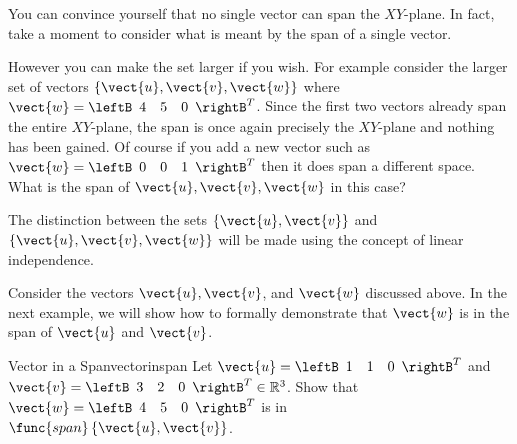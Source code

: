 You can convince yourself that no single vector can span the
$XY$-plane. In fact, take a moment to consider what is meant by the span of a single vector.

However you can make the set larger if you wish. For example consider
the larger set of vectors $\{ \vect{u}, \vect{v},
\vect{w}\}$ where $ \vect{w}=\leftB 
\begin{array}{rrr}
4 & 5 & 0
\end{array}
\rightB^T$. 
Since
the first two vectors already span the entire $XY$-plane, the span is
once again precisely the $XY$-plane and nothing has been gained. Of
course if you add a new vector such as
$ \vect{w}=\leftB 
\begin{array}{rrr}
0 & 0 & 1
\end{array}
\rightB^T$ then it does span a different space. What is the span of $\vect{u}, \vect{v}, \vect{w}$ in this case?   

The distinction between the sets $\{ \vect{u}, \vect{v}\}$ and $\{
\vect{u}, \vect{v}, \vect{w}\}$ will be made using the concept of linear independence. 

Consider the vectors $\vect{u}, \vect{v}$, and $\vect{w}$ discussed above. In the next example, we will show how to formally demonstrate that $\vect{w}$ is in the span of $\vect{u}$ and $\vect{v}$. 

\begin{example}{Vector in a Span}{vectorinspan}
Let $\vect{u}=\leftB 
\begin{array}{rrr}
1  & 1 & 0
\end{array}
\rightB^T$ and
$\vect{v}=\leftB 
\begin{array}{rrr}
3  & 2 & 0
\end{array}
\rightB^T \in \mathbb{R}^{3}$. Show that $\vect{w} = \leftB 
\begin{array}{rrr}
4 & 5 & 0 
\end{array}
\rightB^{T}$ is in $\func{span} \left\{ \vect{u}, \vect{v} \right\}$.
\end{example}

